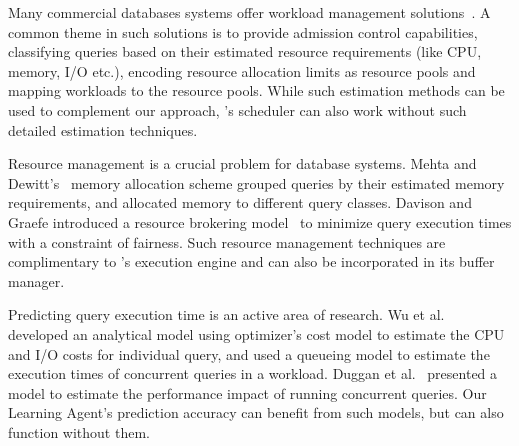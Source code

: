 Many commercial databases systems offer workload management solutions~\cite{res_gov, rm, DB2, teradatawm, gpdb, hpwm}.
A common theme in such solutions is to provide admission control capabilities, classifying queries based on their estimated resource requirements (like CPU, memory, I/O etc.), encoding resource allocation limits as resource pools and mapping workloads to the resource pools. 
While such estimation methods can be used to complement our approach, 
\sys{}'s scheduler can also work without such detailed estimation techniques. 

Resource management is a crucial problem for database systems. 
Mehta and Dewitt's~\cite{mehta1993dynamic} memory allocation scheme
grouped queries by their estimated memory requirements, and allocated memory to different query classes. 
Davison and Graefe introduced a resource brokering model~\cite{davison1995dynamic} to minimize query execution times with a constraint of fairness.
Such resource management techniques are complimentary to \sys{}'s execution engine 
and can also be incorporated in its buffer manager. 

Predicting query execution time is an active area of research. 
Wu et al.~\cite{wu2013towards, wu2014uncertainty} developed an analytical model using optimizer's cost model to estimate the CPU and I/O costs for individual query, and used a queueing model to estimate the execution times of concurrent queries in a workload.
Duggan et al.~\cite{duggan2011performance} presented a model to estimate the performance impact of running concurrent queries.
Our Learning Agent's prediction accuracy can benefit from such models, but can also function without them. 

